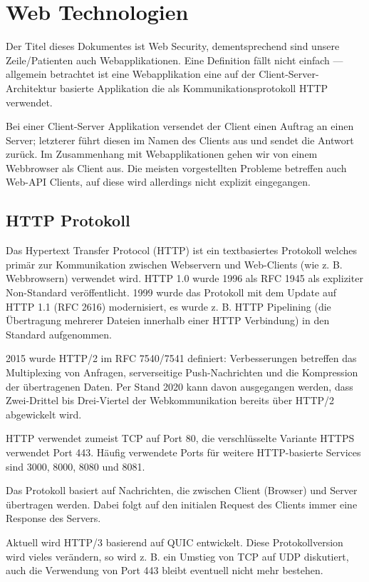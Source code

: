 \chapter{Web Technologien}

Der Titel dieses Dokumentes ist Web Security, dementsprechend sind unsere Zeile/Patienten auch Webapplikationen. Eine Definition fällt nicht einfach --- allgemein betrachtet ist eine Webapplikation eine auf der Client-Server-Architektur basierte Applikation die als Kommunikationsprotokoll HTTP verwendet.

Bei einer Client-Server Applikation versendet der Client einen Auftrag an einen Server; letzterer führt diesen im Namen des Clients aus und sendet die Antwort zurück. Im Zusammenhang mit Webapplikationen gehen wir von einem Webbrowser als Client aus. Die meisten vorgestellten Probleme betreffen auch Web-API Clients, auf diese wird allerdings nicht explizit eingegangen.

\section{HTTP Protokoll}

Das Hypertext Transfer Protocol (HTTP) ist ein textbasiertes Protokoll welches primär zur Kommunikation zwischen Webservern und Web-Clients (wie z. B. Webbrowsern) verwendet wird. HTTP 1.0 wurde 1996 als RFC 1945 als expliziter Non-Standard veröffentlicht. 1999 wurde das Protokoll mit dem Update auf HTTP 1.1 (RFC 2616) modernisiert, es wurde z. B. HTTP Pipelining (die Übertragung mehrerer Dateien innerhalb einer HTTP Verbindung) in den Standard aufgenommen.

2015 wurde HTTP/2 im RFC 7540/7541 definiert: Verbesserungen betreffen das Multiplexing von Anfragen, serverseitige Push-Nachrichten und die Kompression der übertragenen Daten. Per Stand 2020 kann davon ausgegangen werden, dass Zwei-Drittel bis Drei-Viertel der Webkommunikation bereits über HTTP/2 abgewickelt wird.

HTTP verwendet zumeist TCP auf Port 80, die verschlüsselte Variante HTTPS verwendet Port 443. Häufig verwendete Ports für weitere HTTP-basierte Services sind 3000, 8000, 8080 und 8081.

Das Protokoll basiert auf Nachrichten, die zwischen Client (Browser) und Server übertragen werden. Dabei folgt auf den initialen Request des Clients immer eine Response des Servers.

Aktuell wird HTTP/3 basierend auf QUIC entwickelt. Diese Protokollversion wird vieles verändern, so wird z. B. ein Umstieg von TCP auf UDP diskutiert, auch die Verwendung von Port 443 bleibt eventuell nicht mehr bestehen.

